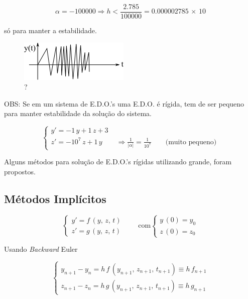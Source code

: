 \[
 \alpha = -100000 \Rightarrow h < \frac{2.785}{100000} = 0.000002785 \, \times \, 10
\]

só para manter a estabilidade.

\begin{figure}[htb]
 \centering
 \includegraphics[scale=1.0]{capitulos/capitulo6/figuras/equa_dif_ord_rig1.png}
 \caption{?}
 \label{fig:equa_dif_ord_rig1}
\end{figure}

OBS: Se em um sistema de E.D.O.'s uma E.D.O. é rígida,  tem de ser pequeno para manter estabilidade da solução do sistema.

\begin{equation}
 \label{cap6:sec5:eq4}
 \left\{
 \begin{array}{l}
  y' = -1 \, y + 1 \, z + 3 \\
  z' = -10^7 \, z + 1 \, y \qquad \Rightarrow \displaystyle \frac{1}{|\alpha|} = \frac{1}{10^7} \qquad \mbox{(muito pequeno)}
 \end{array}
 \right.
\end{equation}

Alguns métodos para solução de E.D.O.'s rígidas utilizando  grande, foram propostos.

\subsection{Métodos Implícitos}

\begin{equation}
 \label{cap6:sec5:eq5}
 \left\{
 \begin{array}{l}
  y' = f \, (y, \, z, \, t) \\
  z' = g \, (y, \, z, \, t)
 \end{array}
 \right.
 \qquad
 \mbox{com}
 \left\{
 \begin{array}{l}
  y \, (0) = y_0 \\
  z \, (0) = z_0
 \end{array}
 \right.
\end{equation}

Usando \textit{Backward} Euler

\begin{equation}
 \label{cap6:sec5:eq6}
 \left\{
 \begin{array}{l}
  y_{n+1} - y_n = h \, f \, (y_{n+1}, \, z_{n+1}, \, t_{n+1}) \equiv h \, f_{n+1} \\
  z_{n+1} - z_n = h \, g \, (y_{n+1}, \, z_{n+1}, \, t_{n+1}) \equiv h \, g_{n+1}
 \end{array}
 \right.
\end{equation}

